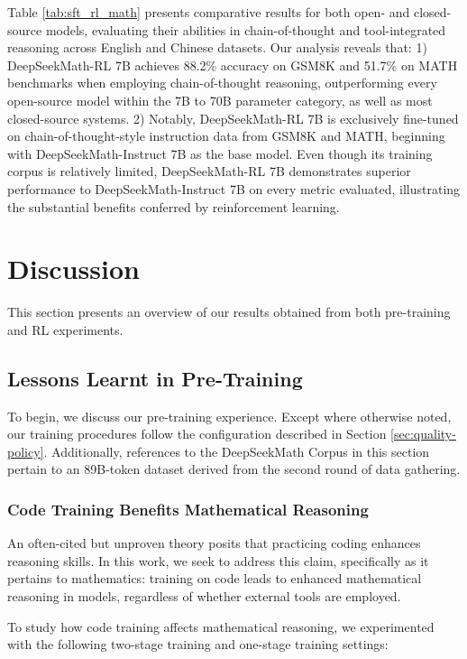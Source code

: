 \begin{itemize}[topsep=0pt]
\begin{itemize}[topsep=0pt]
Table \ref{tab:sft_rl_math} presents comparative results for both open- and closed-source models, evaluating their abilities in chain-of-thought and tool-integrated reasoning across English and Chinese datasets. Our analysis reveals that: 1) DeepSeekMath-RL 7B achieves 88.2\% accuracy on GSM8K and 51.7\% on MATH benchmarks when employing chain-of-thought reasoning, outperforming every open-source model within the 7B to 70B parameter category, as well as most closed-source systems. 2) Notably, DeepSeekMath-RL 7B is exclusively fine-tuned on chain-of-thought-style instruction data from GSM8K and MATH, beginning with DeepSeekMath-Instruct 7B as the base model. Even though its training corpus is relatively limited, DeepSeekMath-RL 7B demonstrates superior performance to DeepSeekMath-Instruct 7B on every metric evaluated, illustrating the substantial benefits conferred by reinforcement learning.

\section{Discussion}
This section presents an overview of our results obtained from both pre-training and RL experiments.

\subsection{Lessons Learnt in Pre-Training}

To begin, we discuss our pre-training experience. Except where otherwise noted, our training procedures follow the configuration described in Section \ref{sec:quality-policy}. Additionally, references to the DeepSeekMath Corpus in this section pertain to an 89B-token dataset derived from the second round of data gathering.

\subsubsection{Code Training Benefits Mathematical Reasoning}

An often-cited but unproven theory posits that practicing coding enhances reasoning skills. In this work, we seek to address this claim, specifically as it pertains to mathematics: training on code leads to enhanced mathematical reasoning in models, regardless of whether external tools are employed.

To study how code training affects mathematical reasoning, we experimented with the following two-stage training and one-stage training settings:


\end{itemize}
\end{itemize}
